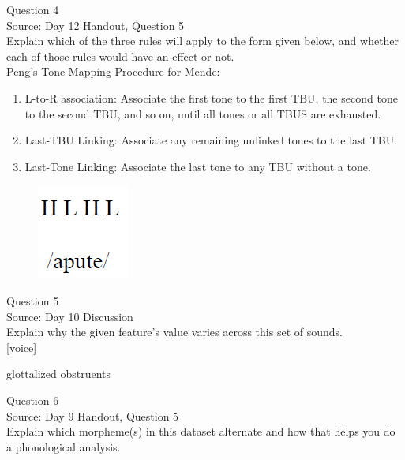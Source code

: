 \documentclass[12pt]{article}
\begin{document}
\newpage

{\large Question 4}\\

Source: Day 12 Handout, Question 5\\

Explain which of the three rules will apply to the form given below, and whether each of those rules would have an effect or not.\\

Peng’s Tone-Mapping Procedure for Mende: \begin{enumerate} \item L-to-R association: Associate the first tone to the first TBU, the second tone to the second TBU, and so on, until all tones or all TBUS are exhausted. \item Last-TBU Linking: Associate any remaining unlinked tones to the last TBU. \item Last-Tone Linking: Associate the last tone to any TBU without a tone. \end{enumerate}

\begin{figure}[H]
\includegraphics{../images/mendetone_d.png}
\end{figure}

\newpage

{\large Question 5}\\

Source: Day 10 Discussion\\

Explain why the given feature's value varies across this set of sounds.\\

{[voice]}

glottalized obstruents


\newpage

{\large Question 6}\\

Source: Day 9 Handout, Question 5\\

Explain which morpheme(s) in this dataset alternate and how that helps you do a phonological analysis.\\
\end{document}
